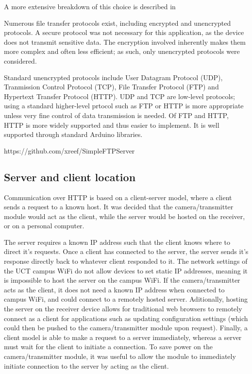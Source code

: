 A more extensive breakdown of this choice is described in %

Numerous file transfer protocols exist, including encrypted and unencrypted protocols. A secure protocol was not necessary for this application, as the device does not transmit sensitive data. The encryption involved inherently makes them more complex and often less efficient; as such, only unencrypted protocols were considered.

Standard unencrypted protocols include User Datagram Protocol (UDP), Tranmission Control Protocol (TCP), File Transfer Protocol (FTP) and Hypertext Transfer Protocol (HTTP). UDP and TCP are low-level protocols; using a standard higher-level prtocol such as FTP or HTTP is more appropriate unless very fine control of data transmission is needed. Of FTP and HTTP, HTTP is more widely supported and thus easier to implement. It is well supported through standard Arduino libraries.

https://github.com/xreef/SimpleFTPServer

\subsection{Server and client location}

Communication over HTTP is based on a client-server model, where a client sends a request to a known host. It was decided that the camera/transmitter module would act as the client, while the server would be hosted on the receiver, or on a personal computer. 

The server requires a known IP address such that the client knows where to direct it's requests. Once a client has connected to the server, the server sends it's response directly back to whatever client responded to it. The network settings of the UCT campus WiFi do not allow devices to set static IP addresses, meaning it is impossible to host the server on the campus WiFi. If the camera/transmitter acts as the client, it does not need a known IP address when connected to campus WiFi, and could connect to a remotely hosted server. Aditionally, hosting the server on the receiver device allows for traditional web browsers to remotely connect as a client for applications such as updating configuration settings (which could then be pushed to the camera/transmitter module upon request). Finally, a client model is able to make a request to a server immediately, whereas a server must wait for the client to initiate a connection. To save power on the camera/transmitter module, it was useful to allow the module to immediately initiate connection to the server by acting as the client.

